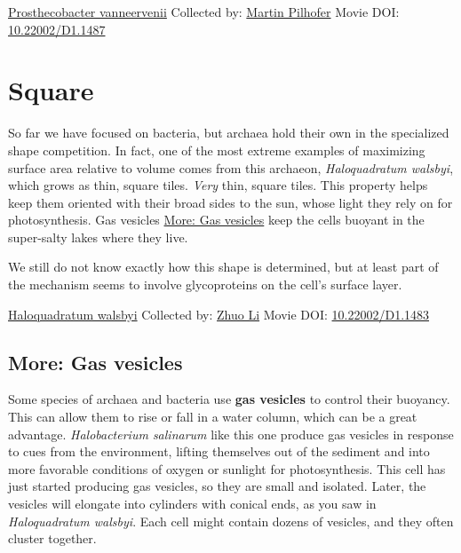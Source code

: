 \documentclass[]{tufte-book}
\begin{document}
\hypertarget{htmlwidget-932aba272fb37a0724f2}{}

\label{fig:3-6a}\protect\hyperlink{tree}{Prosthecobacter vanneervenii} Collected by: \protect\hyperlink{martin_pilhofer}{Martin Pilhofer} Movie DOI: \href{https://doi.org/10.22002/D1.1487}{10.22002/D1.1487}

\hypertarget{square}{%
\section{Square}\label{square}}

So far we have focused on bacteria, but archaea hold their own in the specialized shape competition. In fact, one of the most extreme examples of maximizing surface area relative to volume comes from this archaeon, \emph{Haloquadratum walsbyi}, which grows as thin, square tiles. \emph{Very} thin, square tiles. This property helps keep them oriented with their broad sides to the sun, whose light they rely on for photosynthesis. Gas vesicles \protect\hyperlink{Gas_vesicles}{More: Gas vesicles} keep the cells buoyant in the super-salty lakes where they live.

We still do not know exactly how this shape is determined, but at least part of the mechanism seems to involve glycoproteins on the cell's surface layer.



\hypertarget{htmlwidget-759881a20692edf468bc}{}

\label{fig:3-7}\protect\hyperlink{tree}{Haloquadratum walsbyi} Collected by: \protect\hyperlink{zhuo_li}{Zhuo Li} Movie DOI: \href{https://doi.org/10.22002/D1.1483}{10.22002/D1.1483}

\hypertarget{Gas_vesicles}{%
\subsection*{More: Gas vesicles}\label{Gas_vesicles}}

Some species of archaea and bacteria use \textbf{gas vesicles} to control their buoyancy. This can allow them to rise or fall in a water column, which can be a great advantage. \emph{Halobacterium salinarum} like this one produce gas vesicles in response to cues from the environment, lifting themselves out of the sediment and into more favorable conditions of oxygen or sunlight for photosynthesis. This cell has just started producing gas vesicles, so they are small and isolated. Later, the vesicles will elongate into cylinders with conical ends, as you saw in \emph{Haloquadratum walsbyi}. Each cell might contain dozens of vesicles, and they often cluster together.
\end{document}
